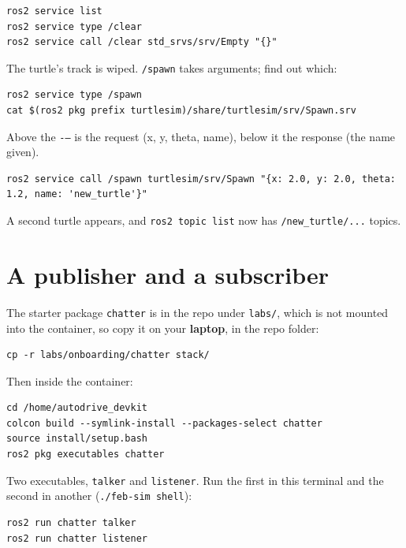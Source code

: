 \documentclass[11pt,a4paper]{article}
\begin{document}
\begin{lstlisting}
ros2 service list
ros2 service type /clear
ros2 service call /clear std_srvs/srv/Empty "{}"
\end{lstlisting}

The turtle's track is wiped. \texttt{/spawn} takes arguments; find out which:

\begin{lstlisting}
ros2 service type /spawn
cat $(ros2 pkg prefix turtlesim)/share/turtlesim/srv/Spawn.srv
\end{lstlisting}

Above the \texttt{-{}--} is the request (x, y, theta, name), below it the response (the name
given).

\begin{lstlisting}
ros2 service call /spawn turtlesim/srv/Spawn "{x: 2.0, y: 2.0, theta: 1.2, name: 'new_turtle'}"
\end{lstlisting}

A second turtle appears, and \texttt{ros2 topic list} now has \texttt{/new\_turtle/...} topics.


\section{A publisher and a subscriber}

The starter package \texttt{chatter} is in the repo under \texttt{labs/}, which is not mounted
into the container, so copy it on your \textbf{laptop}, in the repo folder:

\begin{lstlisting}
cp -r labs/onboarding/chatter stack/
\end{lstlisting}

Then inside the container:

\begin{lstlisting}
cd /home/autodrive_devkit
colcon build --symlink-install --packages-select chatter
source install/setup.bash
ros2 pkg executables chatter
\end{lstlisting}

Two executables, \texttt{talker} and \texttt{listener}. Run the first in this terminal and the
second in another (\texttt{./feb-sim shell}):

\begin{lstlisting}
ros2 run chatter talker
ros2 run chatter listener
\end{lstlisting}
\end{document}
